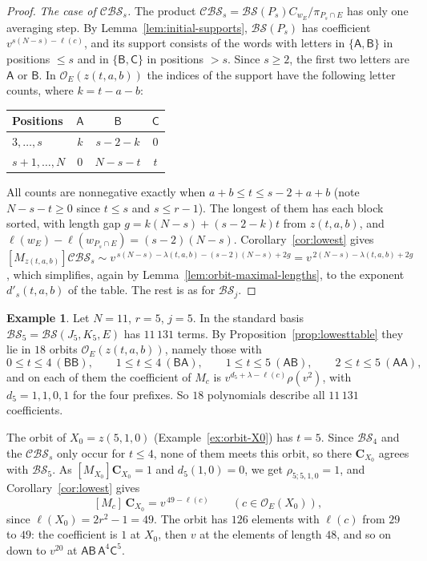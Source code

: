 \documentclass[11pt,a4paper,reqno]{amsart}
\numberwithin{equation}{section}
\theoremstyle{definition}
\newtheorem{example}[theorem]{Example}
\theoremstyle{remark}
\theoremstyle{plain}
\newcommand{\C}{\mathbf C}
\newcommand{\A}{\mathsf A}
\newcommand{\B}{\mathsf B}
\newcommand{\CC}{\mathsf C}
\newcommand{\D}{\mathcal {BS}}
\newcommand{\R}{\mathcal {BS}}
\newcommand{\V}{\mathcal {CBS}}
\begin{document}
\begin{proof}
\emph{The case of $\V_s$.} The product $\V_s=\D(P_s)C_{w_E}/\pi_{P_s\cap E}$ has only one averaging step. By
Lemma~\ref{lem:initial-supports}, $\D(P_s)$ has coefficient $v^{s(N-s)-\ell(c)}$, and its support consists of the words with
letters in $\{\A,\B\}$ in positions $\leq s$ and in $\{\B,\CC\}$ in positions $>s$. Since $s\geq2$, the first two letters are
$\A$ or $\B$. In $\mathcal O_E(z(t,a,b))$ the indices of the support have the following letter counts, where $k=t-a-b$:
\begin{center}
\begin{tabular}{@{}lccc@{}}
\toprule
Positions & $\A$ & $\B$ & $\CC$\\\midrule
$3,\ldots,s$ & $k$ & $s-2-k$ & $0$\\
$s+1,\ldots,N$ & $0$ & $N-s-t$ & $t$\\\bottomrule
\end{tabular}
\end{center}
All counts are nonnegative exactly when $a+b\leq t\leq s-2+a+b$ (note $N-s-t\geq0$ since $t\leq s$ and $s\leq r-1$). The longest of them has each block
sorted, with length gap $g=k(N-s)+(s-2-k)t$ from $z(t,a,b)$, and $\ell(w_E)-\ell(w_{P_s\cap E})=(s-2)(N-s)$.
Corollary~\ref{cor:lowest} gives $[M_{z(t,a,b)}]\V_s\sim v^{\,s(N-s)-\lambda(t,a,b)-(s-2)(N-s)+2g}=v^{\,2(N-s)-\lambda(t,a,b)+2g}$, which simplifies, again by
Lemma~\ref{lem:orbit-maximal-lengths}, to the exponent $d'_s(t,a,b)$ of the table. The rest is as for $\R_j$.
\end{proof}

\begin{example}\label{ex:lowesttable-N11}
Let $N=11$, $r=5$, $j=5$. In the standard basis $\R_5=\D(J_5,K_5,E)$ has $11\,131$ terms. By
Proposition~\ref{prop:lowesttable} they lie in $18$ orbits $\mathcal O_E(z(t,a,b))$, namely those with
\[
 0\leq t\leq4\ (\B\B),\qquad 1\leq t\leq4\ (\B\A),\qquad 1\leq t\leq5\ (\A\B),\qquad 2\leq t\leq5\ (\A\A),
\]
and on each of them the coefficient of $M_c$ is $v^{d_5+\lambda-\ell(c)}\rho(v^2)$, with $d_5=1,1,0,1$ for the four prefixes.
So $18$ polynomials describe all $11\,131$ coefficients.

The orbit of $X_0=z(5,1,0)$ (Example~\ref{ex:orbit-X0}) has $t=5$. Since $\R_4$ and the $\V_s$ only occur for $t\leq4$, none of them meets this orbit, so there $\C_{X_0}$ agrees with $\R_5$. As $[M_{X_0}]\C_{X_0}=1$ and $d_5(1,0)=0$, we get
$\rho_{5;5,1,0}=1$, and Corollary~\ref{cor:lowest} gives
\[
 [M_c]\,\C_{X_0}=v^{\,49-\ell(c)}\qquad(c\in\mathcal O_E(X_0)),
\]
since $\ell(X_0)=2r^2-1=49$. The orbit has $126$ elements with $\ell(c)$ from $29$ to $49$: the coefficient is $1$ at $X_0$, then $v$ at the elements of length
$48$, and so on down to $v^{20}$ at $\A\B\,\A^4\CC^5$.
\end{example}
\end{document}
